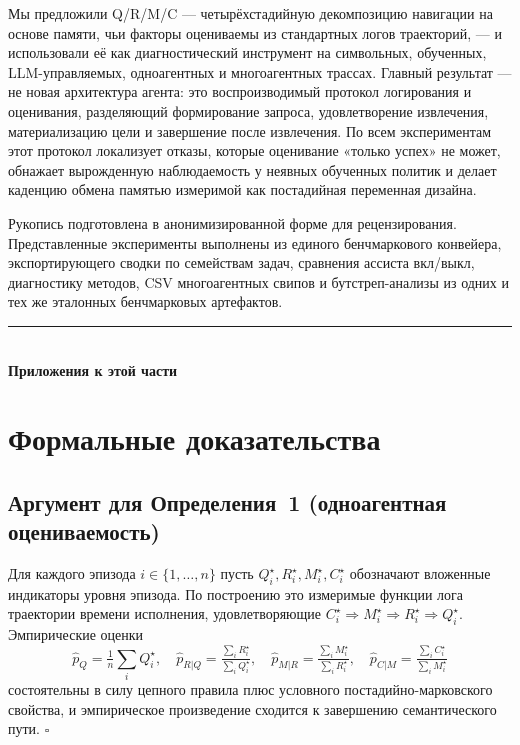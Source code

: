 \documentclass{article}
\begin{document}
Мы предложили Q/R/M/C --- четырёхстадийную декомпозицию навигации на основе
памяти, чьи факторы оцениваемы из стандартных логов траекторий, ---
и использовали её как диагностический инструмент на символьных, обученных,
LLM-управляемых, одноагентных и многоагентных трассах. Главный результат ---
не новая архитектура агента: это воспроизводимый протокол логирования и
оценивания, разделяющий формирование запроса, удовлетворение
извлечения, материализацию цели и завершение после извлечения.
По всем экспериментам этот протокол локализует отказы, которые
оценивание «только успех» не может, обнажает вырожденную наблюдаемость у
неявных обученных политик и делает каденцию обмена памятью измеримой
как постадийная переменная дизайна.

\begin{ack}
Рукопись подготовлена в анонимизированной форме для рецензирования.
Представленные эксперименты выполнены из единого бенчмаркового конвейера,
экспортирующего сводки по семействам задач, сравнения ассиста вкл/выкл, диагностику
методов, CSV многоагентных свипов и бутстреп-анализы из
одних и тех же эталонных бенчмарковых артефактов.
\end{ack}

{\small

}

\FloatBarrier
\begin{center}\rule{0.55\linewidth}{0.4pt}\\[2pt]\textbf{Приложения к этой части}\end{center}


\section{Формальные доказательства}
\label{p1:app:proofs}

\subsection{Аргумент для Определения~1 (одноагентная оцениваемость)}

Для каждого эпизода $i \in \{1,\dots,n\}$ пусть $Q_i^\star, R_i^\star, M_i^\star, C_i^\star$ обозначают вложенные индикаторы уровня эпизода. По построению это измеримые функции лога траектории времени исполнения, удовлетворяющие $C_i^\star \Rightarrow M_i^\star \Rightarrow R_i^\star \Rightarrow Q_i^\star$. Эмпирические оценки
\[
\hat p_Q = \tfrac{1}{n}\sum_i Q_i^\star,\quad
\hat p_{R|Q} = \tfrac{\sum_i R_i^\star}{\sum_i Q_i^\star},\quad
\hat p_{M|R} = \tfrac{\sum_i M_i^\star}{\sum_i R_i^\star},\quad
\hat p_{C|M} = \tfrac{\sum_i C_i^\star}{\sum_i M_i^\star}
\]
состоятельны в силу цепного правила плюс условного постадийно-марковского свойства, и эмпирическое произведение сходится к завершению семантического пути. \hfill$\square$
\end{document}

